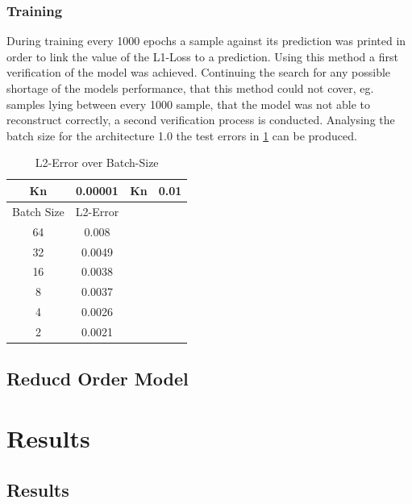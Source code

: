 \documentclass[12pt, a4paper]{article}
\begin{document}
\subsubsection{Training}
During training every 1000 epochs a sample against its prediction was printed in order to link the value of the L1-Loss to a prediction. Using this method a first verification of the model was achieved. Continuing the search for any possible shortage of the models performance, that this method could not cover, eg. samples lying between every 1000 sample, that the model was not able to reconstruct correctly, a second verification process is conducted.
Analysing the batch size for the architecture 1.0 the test errors in \cref{Tab:Batch} can be produced.
\begin{table}[!htbp]\centering
	\begin{tabular}{ |c c|c c| }
		\hline
		Kn & 0.00001& Kn &0.01  \\ [.5ex]
		\hline
		Batch Size & L2-Error && \\ \hline
		64 & 0.008  &&\\ 
		32 & 0.0049 &&\\ \hline
		16 & 0.0038 &&\\ \hline
		8 & 0.0037&&\\ \hline
		4 & 0.0026&&\\ \hline
		2 & 0.0021&&\\
		\hline
	\end{tabular}
	\caption{L2-Error over Batch-Size}
	\label{Tab:Batch}
\end{table}
\subsection{Reducd Order Model}\label{Reduced Order Model}

\section{Results}
\subsection{Results}
\end{document}
